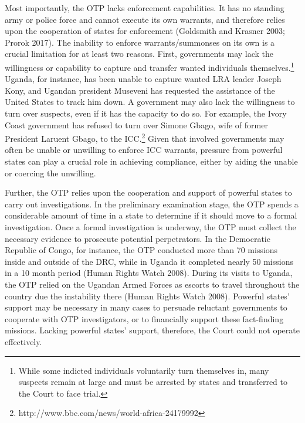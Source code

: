 Most importantly, the OTP lacks enforcement capabilities. It has no standing army or police force and cannot execute its own warrants, and therefore relies upon the cooperation of states for enforcement (Goldsmith and Krasner 2003; Prorok 2017). The inability to enforce warrants/summonses on its own is a crucial limitation for at least two reasons. First, governments may lack the willingness or capability to capture and transfer wanted individuals themselves.\footnote{While some indicted individuals voluntarily turn themselves in, many suspects remain at large and must be arrested by states and transferred to the Court to face trial.} Uganda, for instance, has been unable to capture wanted LRA leader Joseph Kony, and Ugandan president Museveni has requested the assistance of the United States to track him down. A government may also lack the willingness to turn over suspects, even if it has the capacity to do so. For example, the Ivory Coast government has refused to turn over Simone Gbago, wife of former President Laruent Gbago, to the ICC.\footnote{http://www.bbc.com/news/world-africa-24179992} Given that involved governments may often be unable or unwilling to enforce ICC warrants, pressure from powerful states can play a crucial role in achieving compliance, either by aiding the unable or coercing the unwilling.

Further, the OTP relies upon the cooperation and support of powerful states to carry out investigations. In the preliminary examination stage, the OTP spends a considerable amount of time in a state to determine if it should move to a formal investigation. Once a formal investigation is underway, the OTP must collect the necessary evidence to prosecute potential perpetrators. In the Democratic Republic of Congo, for instance, the OTP conducted more than 70 missions inside and outside of the DRC, while in Uganda it completed nearly 50 missions in a 10 month period (Human Rights Watch 2008). During its visits to Uganda, the OTP relied on the Ugandan Armed Forces as escorts to travel throughout the country due the instability there (Human Rights Watch 2008). Powerful states' support may be necessary in many cases to persuade reluctant governments to cooperate with OTP investigators, or to financially support these fact-finding missions. Lacking powerful states' support, therefore, the Court could not operate effectively.

